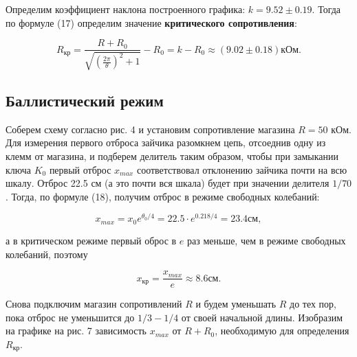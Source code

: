 \documentclass[a4paper,12pt]{article} %
\begin{document}
\hfill \break Определим коэффициент наклона построенного графика: $k = 9.52 \pm 0.19$. Тогда по формуле (17) определим значение \textbf{критического сопротивления}:

$$
R_\text{кр} = \frac{R+R_{0}}{\sqrt{(\frac{2\pi}{\theta})^2+1}}-R_{0} = k - R_{0} \approx (9.02 \pm 0.18) \text{кОм}.
$$

\subsection{Баллистический режим}
\hfill \break Соберем схему согласно рис. 4 и установим сопротивление магазина $R = 50$ кОм. Для измерения первого отброса зайчика разомкнем цепь, отсоеднив одну из клемм от магазина, и подберем делитель таким образом, чтобы при замыкании ключа $K_{0}$ первый отброс $x_{max}$ соответствовал отклонению зайчика почти на всю шкалу. Отброс 22.5 см (а это почти вся шкала) будет при значении делителя $1/70$. Тогда, по формуле (18), получим отброс в режиме свободных колебаний:

$$
x_{max} = x_{0}e^{\theta_{0}/4} = 22.5 \cdot e^{0.218/4} = 23.4 \text{см},
$$

\hfill \break а в критическом режиме первый оброс в $e$ раз меньше, чем в режиме свободных колебаний, поэтому

$$
x_\text{кр} = \frac{x_{max}}{e} \approx 8.6 \text{см}.
$$

\hfill \break Снова подключим магазин сопротивлений $R$ и будем уменьшать $R$ до тех пор, пока отброс не уменьшится до $1/3 - 1/4$ от своей начальной длины. Изобразим на графике на рис. 7 зависимость $x_{max}$ от $R+R_{0}$, необходимую для определения $R_{кр}$.
\end{document}
